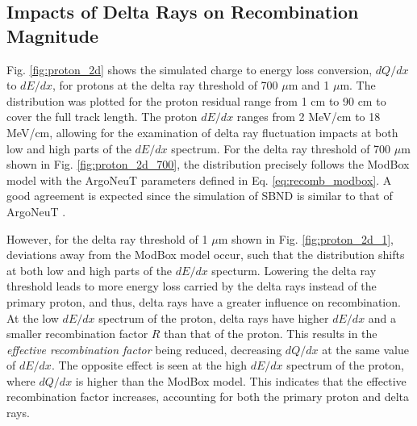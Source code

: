 \subsection{Impacts of Delta Rays on Recombination Magnitude}
\label{sec:impactDeltaRayMag}

Fig. \ref{fig:proton_2d} shows the simulated charge to energy loss conversion, $dQ/dx$ to $dE/dx$, for protons at the delta ray threshold of 700 $\mu$m and 1 $\mu$m.
The distribution was plotted for the proton residual range from 1 cm to 90 cm to cover the full track length. 
The proton $dE/dx$ ranges from 2 MeV/cm to 18 MeV/cm, allowing for the examination of delta ray fluctuation impacts at both low and high parts of the $dE/dx$ spectrum. 
For the delta ray threshold of 700 $\mu$m shown in Fig. \ref{fig:proton_2d_700}, the distribution precisely follows the ModBox model with the ArgoNeuT parameters defined in Eq. \ref{eq:recomb_modbox}.
A good agreement is expected since the simulation of SBND is similar to that of ArgoNeuT \cite{argoneut_recomb}.

However, for the delta ray threshold of 1 $\mu$m shown in Fig. \ref{fig:proton_2d_1}, deviations away from the ModBox model occur, such that the distribution shifts at both low and high parts of the $dE/dx$ specturm. 
Lowering the delta ray threshold leads to more energy loss carried by the delta rays instead of the primary proton, and thus, delta rays have a greater influence on recombination.
At the low $dE/dx$ spectrum of the proton, delta rays have higher $dE/dx$ and a smaller recombination factor $R$ than that of the proton.
This results in the \textit{effective recombination factor} being reduced, decreasing $dQ/dx$ at the same value of $dE/dx$. 
The opposite effect is seen at the high $dE/dx$ spectrum of the proton, where $dQ/dx$ is higher than the ModBox model.
This indicates that the effective recombination factor increases, accounting for both the primary proton and delta rays.


